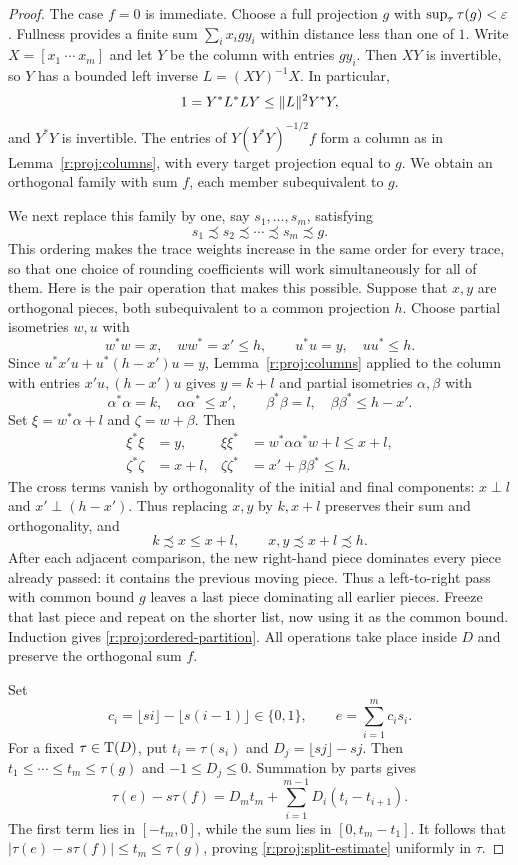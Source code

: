 \begin{proof}
The case $f=0$ is immediate.  Choose a full projection $g$ with
$\sup_\tau\tau(g)<\varepsilon$.  Fullness provides a finite sum
$\sum_i x_i g y_i$ within distance less than one of $1$.
Write $X=[x_1\ \cdots\ x_m]$ and let $Y$ be the column with entries
$gy_i$.  Then $XY$ is invertible, so $Y$ has a bounded left inverse
$L=(XY)^{-1}X$.  In particular,
\[
  1=Y^*L^*LY\le\lVert L\rVert^2Y^*Y,
\]
and $Y^*Y$ is invertible.  The entries of
$Y(Y^*Y)^{-1/2}f$ form a column as in Lemma~\ref{r:proj:columns}, with every
target projection equal to $g$.  We obtain an orthogonal family with
sum $f$, each member subequivalent to $g$.

We next replace this family by one, say $s_1,\ldots,s_m$, satisfying
\begin{equation}\label{r:proj:ordered-partition}
  s_1\precsim s_2\precsim\cdots\precsim s_m\precsim g.
\end{equation}
This ordering makes the trace weights increase in the same order for
every trace, so that one choice of rounding coefficients will work
simultaneously for all of them.
Here is the pair operation that makes this possible.  Suppose that $x,y$
are orthogonal pieces, both subequivalent to a common projection $h$.
Choose partial isometries $w,u$ with
\[
  w^*w=x,\quad ww^*=x'\le h,
  \qquad u^*u=y,\quad uu^*\le h.
\]
Since $u^*x'u+u^*(h-x')u=y$, Lemma~\ref{r:proj:columns} applied to the
column with entries $x'u,(h-x')u$ gives $y=k+l$ and partial isometries
$\alpha,\beta$ with
\[
  \alpha^*\alpha=k,\quad \alpha\alpha^*\le x',
  \qquad \beta^*\beta=l,\quad \beta\beta^*\le h-x'.
\]
Set $\xi=w^*\alpha+l$ and $\zeta=w+\beta$.  Then
\begin{align*}
  \xi^*\xi&=y,&
  \xi\xi^*&=w^*\alpha\alpha^*w+l\le x+l,\\
  \zeta^*\zeta&=x+l,&
  \zeta\zeta^*&=x'+\beta\beta^*\le h.
\end{align*}
The cross terms vanish by orthogonality of the initial and final
components: $x\perp l$ and $x'\perp(h-x')$.
Thus replacing $x,y$ by $k,x+l$
preserves their sum and orthogonality, and
\[
  k\precsim x\le x+l,
  \qquad x,y\precsim x+l\precsim h.
\]
After each adjacent comparison, the new right-hand piece dominates
every piece already passed: it contains the previous moving piece.
Thus a left-to-right pass with common bound $g$ leaves a last piece
dominating all earlier pieces.  Freeze that last
piece and repeat on the shorter list, now using it as the common bound.
Induction gives \eqref{r:proj:ordered-partition}.  All operations take place
inside $D$ and preserve the orthogonal sum $f$.

Set
\[
  c_i=\lfloor si\rfloor-\lfloor s(i-1)\rfloor\in\{0,1\},
  \qquad e=\sum_{i=1}^m c_i s_i.
\]
For a fixed $\tau\in\operatorname T(D)$, put $t_i=\tau(s_i)$ and
$D_j=\lfloor sj\rfloor-sj$.  Then $t_1\le\cdots\le t_m\le\tau(g)$ and
$-1\le D_j\le0$.  Summation by parts gives
\[
  \tau(e)-s\tau(f)
   =D_m t_m+\sum_{i=1}^{m-1}D_i(t_i-t_{i+1}).
\]
The first term lies in $[-t_m,0]$, while the sum lies in
$[0,t_m-t_1]$.  It follows that
$|\tau(e)-s\tau(f)|\le t_m\le\tau(g)$, proving
\eqref{r:proj:split-estimate} uniformly in $\tau$.
\end{proof}

